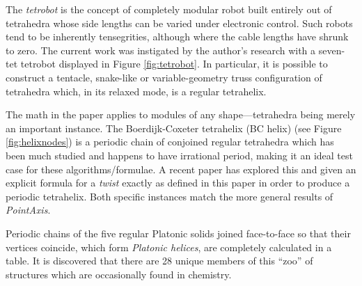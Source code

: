 \documentclass{svproc}
\begin{document}
The {\em tetrobot}\cite{TetrobotBook} is the concept of completely
modular robot built entirely out of tetrahedra whose side lengths can
be varied under electronic control. Such robots tend to be inherently
tensegrities\cite{NTRT}, although where the cable lengths
have shrunk to zero.
The current work was instigated by the author's research with a seven-tet tetrobot
displayed in Figure
\ref{fig:tetrobot}.
In particular, it is possible to construct a tentacle, snake-like or
variable-geometry truss configuration of tetrahedra which, in its relaxed
mode, is a regular tetrahelix.

The math in the paper applies to modules of any shape---tetrahedra being
merely an important instance.
The Boerdijk-Coxeter tetrahelix (BC helix) (see Figure \ref{fig:helixnodes}) is a periodic chain of conjoined regular tetrahedra
which has been much studied\cite{coxeter1985simplicial,sadler2019periodic,fuller1982synergetics,read2018transforming}
and happens to have irrational period, making it an ideal
test case for these algorithms/formulae. A recent paper\cite{sadler2019periodic} has explored this
and given an explicit formula for a {\em twist} exactly as defined in this
paper in order to produce a periodic tetrahelix. Both specific instances match the more general results of {\em PointAxis}.

Periodic chains of the five regular Platonic solids joined face-to-face so that their vertices coincide,
which form {\em Platonic helices}\cite{elgersma2016quadrahelix,lord2001sphere}, are completely calculated in a table\cite{readfullsegmentedhelix}.
It is discovered that there are 28 unique members of this ``zoo'' of structures which are occasionally found in chemistry\cite{lord2004gamma,pearce1990structure}.


% 


% 




\end{document}
